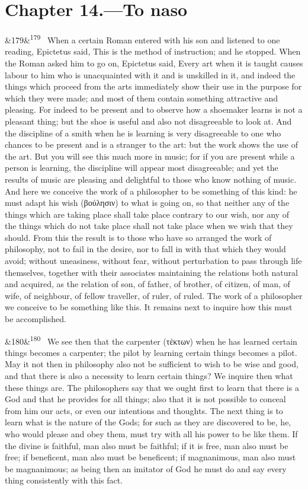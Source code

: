 \documentclass[12pt]{article}
\newcommand{\para}[1][]{\par\noindent\ifx&#1&\else\textsuperscript{\footnotesize #1}~\fi}
\begin{document}
\section*{Chapter 14.---To naso}

\para[179] When a certain Roman entered with his son and listened to one reading, Epictetus said, This is the method of instruction; and he stopped. When the Roman asked him to go on, Epictetus said, Every art when it is taught causes labour to him who is unacquainted with it and is unskilled in it, and indeed the things which proceed from the arts immediately show their use in the purpose for which they were made; and most of them contain something attractive and pleasing. For indeed to be present and to observe how a shoemaker learns is not a pleasant thing; but the shoe is useful and also not disagreeable to look at. And the discipline of a smith when he is learning is very disagreeable to one who chances to be present and is a stranger to the art: but the work shows the use of the art. But you will see this much more in music; for if you are present while a person is learning, the discipline will appear most disagreeable; and yet the results of music are pleasing and delightful to those who know nothing of music. And here we conceive the work of a philosopher to be something of this kind: he must adapt his wish (βούλησιν) to what is going on, so that neither any of the things which are taking place shall take place contrary to our wish, nor any of the things which do not take place shall not take place when we wish that they should. From this the result is to those who have so arranged the work of philosophy, not to fail in the desire, nor to fall in with that which they would avoid; without uneasiness, without fear, without perturbation to pass through life themselves, together with their associates maintaining the relations both natural and acquired, as the relation of son, of father, of brother, of citizen, of man, of wife, of neighbour, of fellow traveller, of ruler, of ruled. The work of a philosopher we conceive to be something like this. It remains next to inquire how this must be accomplished.

\para[180] We see then that the carpenter (τέκτων) when he has learned certain things becomes a carpenter; the pilot by learning certain things becomes a pilot. May it not then in philosophy also not be sufficient to wish to be wise and good, and that there is also a necessity to learn certain things? We inquire then what these things are. The philosophers say that we ought first to learn that there is a God and that he provides for all things; also that it is not possible to conceal from him our acts, or even our intentions and thoughts. The next thing is to learn what is the nature of the Gods; for such as they are discovered to be, he, who would please and obey them, must try with all his power to be like them. If the divine is faithful, man also must be faithful; if it is free, man also must be free; if beneficent, man also must be beneficent; if magnanimous, man also must be magnanimous; as being then an imitator of God he must do and say every thing consistently with this fact.
\end{document}
